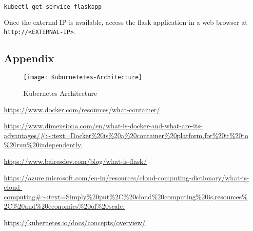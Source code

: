 \documentclass{article}
\begin{document}
\begin{lstlisting}[language=bash]
kubectl get service flaskapp
\end{lstlisting}
Once the external IP is available, access the flask application in a web browser at \texttt{http://<EXTERNAL-IP>}.

\clearpage

\begin{appendices}
\section{Appendix}

\begin{figure}[h!]
  \centering
  \hspace*{-2cm}
\texttt{[image: Kuburnetetes-Architecture]}
  \caption{Kubernetes Architecture}
  \label{fig:appendix-image1}
\end{figure}


\end{appendices}

\clearpage

\begin{thebibliography}{9}

\url{https://www.docker.com/resources/what-container/}

\url{https://www.dimensiona.com/en/what-is-docker-and-what-are-its-advantages/#:~:text=Docker%20is%20a%20container%20platform,for%20it%20to%20run%20independently.}

\url{https://www.bairesdev.com/blog/what-is-flask/}

\url{https://azure.microsoft.com/en-in/resources/cloud-computing-dictionary/what-is-cloud-computing#:~:text=Simply%20put%2C%20cloud%20computing%20is,resources%2C%20and%20economies%20of%20scale.}

\url{https://kubernetes.io/docs/concepts/overview/}

\end{thebibliography}
\end{document}
